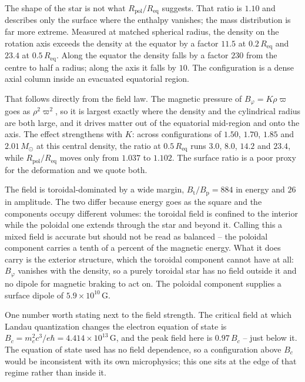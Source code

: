 \documentclass{aa}
\begin{document}
The shape of the star is not what $R_{\mathrm{pol}}/R_{\mathrm{eq}}$
suggests. That ratio is $1.10$ and describes only the surface where the
enthalpy vanishes; the mass distribution is far more extreme. Measured at
matched spherical radius, the density on the rotation axis exceeds the
density at the equator by a factor $11.5$ at $0.2\,R_{\mathrm{eq}}$ and
$23.4$ at $0.5\,R_{\mathrm{eq}}$. Along the equator the density falls by a
factor $230$ from the centre to half a radius; along the axis it falls by
$10$. The configuration is a dense axial column inside an evacuated
equatorial region.

That follows directly from the field law. The magnetic pressure of
$B_\varphi = K\rho\varpi$ goes as $\rho^2\varpi^2$, so it is largest exactly
where the density and the cylindrical radius are both large, and it drives
matter out of the equatorial mid-region and onto the axis. The effect
strengthens with $K$: across configurations of $1.50$, $1.70$, $1.85$ and
$2.01\,M_\odot$ at this central density, the ratio at $0.5\,R_{\mathrm{eq}}$
runs $3.0$, $8.0$, $14.2$ and $23.4$, while
$R_{\mathrm{pol}}/R_{\mathrm{eq}}$ moves only from $1.037$ to $1.102$. The
surface ratio is a poor proxy for the deformation and we quote both.

The field is toroidal-dominated by a wide margin,
$B_{\mathrm{t}}/B_{\mathrm{p}} = 884$ in energy and $26$ in amplitude.
The two differ because energy goes as the square and the components
occupy different volumes: the toroidal field is confined to the interior
while the poloidal one extends through the star and beyond it. Calling
this a mixed field is accurate but should not be read as balanced -- the
poloidal component carries a tenth of a percent of the magnetic energy.
What it does carry is the exterior structure, which the toroidal
component cannot have at all: $B_\varphi$ vanishes with the density, so a
purely toroidal star has no field outside it and no dipole for magnetic
braking to act on. The poloidal component supplies a surface dipole of
$5.9\times10^{10}$\,G.

One number worth stating next to the field strength. The critical field
at which Landau quantization changes the electron equation of state is
$B_c = m_e^2c^3/e\hbar = 4.414\times10^{13}$\,G, and the peak field here
is $0.97\,B_c$ -- just below it. The equation of state used has no field
dependence, so a configuration above $B_c$ would be inconsistent with its
own microphysics; this one sits at the edge of that regime rather than
inside it.
\end{document}
